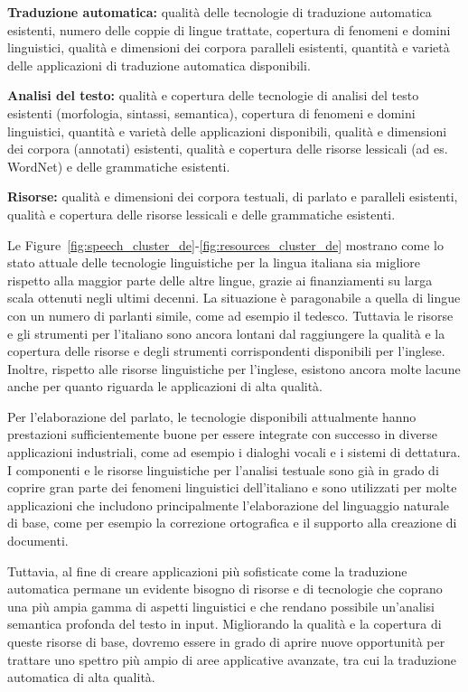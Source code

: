 \begin{multicols}{2}
\textbf{Traduzione automatica:} qualit\`{a} delle tecnologie di traduzione automatica esistenti, numero delle coppie di lingue trattate, 
copertura di fenomeni e domini linguistici, qualit\`{a} e dimensioni dei corpora paralleli esistenti, quantit\`{a} e variet\`{a} 
delle applicazioni di traduzione automatica disponibili.

\textbf{Analisi del testo:} qualit\`{a} e copertura delle tecnologie di analisi del testo esistenti (morfologia, sintassi, semantica),
copertura di fenomeni e domini linguistici, quantit\`{a} e variet\`{a} delle applicazioni disponibili, qualit\`{a} e dimensioni dei
corpora (annotati) esistenti, qualit\`{a} e copertura delle risorse lessicali (ad es. WordNet) e delle grammatiche esistenti.

\textbf{Risorse:} qualit\`{a} e dimensioni dei corpora testuali, di parlato e paralleli esistenti, qualit\`{a} e copertura delle risorse lessicali e 
delle grammatiche esistenti. 

Le Figure~\ref{fig:speech_cluster_de}-\ref{fig:resources_cluster_de} mostrano come lo stato attuale delle tecnologie linguistiche per la lingua italiana sia migliore rispetto alla maggior parte delle altre lingue, grazie ai finanziamenti su larga scala ottenuti negli ultimi decenni. La situazione \`{e} paragonabile a quella di lingue con un numero di parlanti simile, come ad esempio il tedesco. Tuttavia le risorse e gli strumenti per l'italiano sono ancora lontani dal raggiungere la qualit\`{a} e la copertura delle risorse e degli strumenti corrispondenti disponibili per l'inglese. Inoltre, rispetto alle risorse linguistiche per l'inglese, esistono ancora molte lacune anche per quanto riguarda le applicazioni di alta qualit\`{a}.

Per l'elaborazione del parlato, le tecnologie disponibili attualmente hanno prestazioni sufficientemente buone per essere integrate con successo in diverse applicazioni industriali, come ad esempio i dialoghi vocali e i sistemi di dettatura. I componenti e le risorse linguistiche per l'analisi testuale sono gi\`{a} in grado di coprire gran parte dei fenomeni linguistici dell'italiano e sono utilizzati per molte applicazioni che includono principalmente l'elaborazione del linguaggio naturale di base, come per esempio la correzione ortografica e il supporto alla creazione di documenti.

Tuttavia, al fine di creare applicazioni pi\`{u} sofisticate come la traduzione automatica permane un evidente bisogno di risorse e di tecnologie che coprano una pi\`{u} ampia gamma di aspetti linguistici e che rendano possibile un'analisi semantica profonda del testo in input. Migliorando la qualit\`{a} e la copertura di queste risorse di base, dovremo essere in grado di aprire nuove opportunit\`{a} per trattare uno spettro pi\`{u} ampio di aree applicative avanzate, tra cui la traduzione automatica di alta qualit\`{a}.


\end{multicols}
